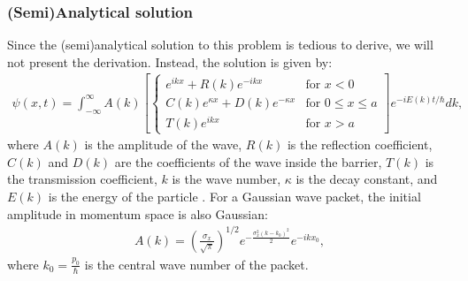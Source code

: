\subsubsection{(Semi)Analytical solution}
Since the (semi)analytical solution to this problem is tedious to derive, we will not present the derivation. Instead, the solution is given by:
\begin{gather}
    \psi(x, t) = \int_{-\infty}^{\infty} A(k) \left[ 
    \begin{cases}
    e^{ikx} + R(k) e^{-ikx} & \text{for } x < 0 \\
    C(k) e^{\kappa x} + D(k) e^{-\kappa x} & \text{for } 0 \leq x \leq a \\
    T(k) e^{ikx} & \text{for } x > a
    \end{cases}
    \right] e^{-iE(k)t/\hbar} dk, \label{eq: b anal}
\end{gather}
where $A(k)$ is the amplitude of the wave, $R(k)$ is the reflection coefficient, $C(k)$ and $D(k)$ are the coefficients of the wave inside the barrier, $T(k)$ is the transmission coefficient, $k$ is the wave number, $\kappa$ is the decay constant, and $E(k)$ is the energy of the particle \cite{Griffiths_2005}.
For a Gaussian wave packet, the initial amplitude in momentum space is also Gaussian:
\begin{gather}
    A(k) = \left( \frac{\sigma_x}{\sqrt{\pi}} \right)^{1/2} e^{-\frac{\sigma_x^2 (k - k_0)^2}{2}} e^{-ikx_0},
\end{gather}
where $k_0 = \frac{p_0}{\hbar}$ is the central wave number of the packet.

